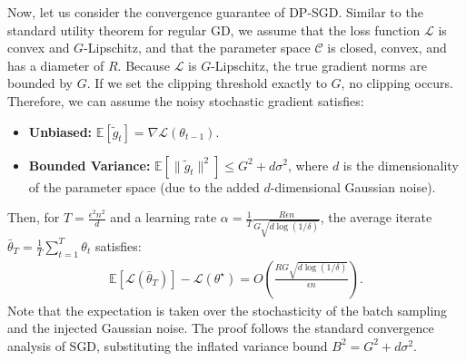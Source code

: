 \documentclass[11pt, a4paper]{article}
\newcommand{\E}[1]{\mathify{\mathbb{E}\left[#1\right]}}
\begin{document}
Now, let us consider the convergence guarantee of DP-SGD.
Similar to the standard utility theorem for regular GD, we assume that the loss function $\mathcal{L}$ is convex and $G$-Lipschitz,
and that the parameter space $\mathcal{C}$ is closed, convex, and has a diameter of $R$.
Because $\mathcal{L}$ is $G$-Lipschitz, the true gradient norms are bounded by $G$. If we set the clipping threshold exactly to $G$, no clipping occurs. Therefore, we can assume the noisy stochastic gradient satisfies:
\begin{itemize}
    \item \textbf{Unbiased:} $\mathbb{E}[\tilde{g}_t] = \nabla \mathcal{L}(\theta_{t-1})$.
    \item \textbf{Bounded Variance:} $\mathbb{E}[\|\tilde{g}_t\|^2] \leq G^2 + d\sigma^2$, where $d$ is the dimensionality of the parameter space (due to the added $d$-dimensional Gaussian noise).
\end{itemize}

Then, for $T = \frac{\epsilon^2 n^2}{d}$ and a learning rate $\alpha = \frac{1}{T} \frac{R\epsilon n}{G\sqrt{d\log (1/\delta)}}$, the average iterate $\bar{\theta}_T = \frac{1}{T}\sum_{t=1}^T \theta_t$ satisfies:
\begin{align}
    \mathbb{E}[\mathcal{L}(\bar{\theta}_T)] - \mathcal{L}(\theta^\star) = O\left(\frac{RG\sqrt{d\log (1/\delta)}}{\epsilon n}\right).
\end{align}
Note that the expectation is taken over the stochasticity of the batch sampling and the injected Gaussian noise. The proof follows the standard convergence analysis of SGD, substituting the inflated variance bound $B^2 = G^2 + d\sigma^2$.

% 
\end{document}
